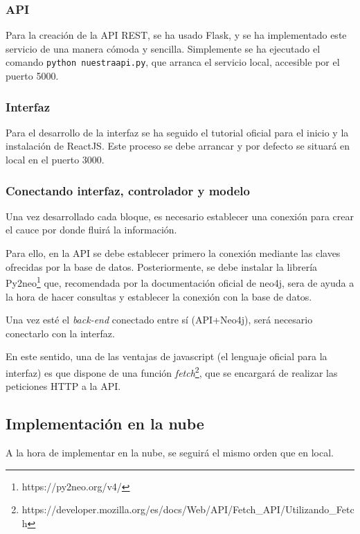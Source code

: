 \subsubsection{API}

Para la creación de la API REST, se ha usado Flask, y se ha implementado este servicio de una manera cómoda y sencilla. Simplemente se ha ejecutado el comando \texttt{python nuestraapi.py}, que arranca el servicio local, accesible por el puerto 5000\cite{flaskinstall}.

\subsubsection{Interfaz}

Para el desarrollo de la interfaz se ha seguido el tutorial oficial para el inicio y la instalación de ReactJS\cite{reactinstall}. Este proceso se debe arrancar y por defecto se situará en local en el puerto 3000.

\subsubsection{Conectando interfaz, controlador y modelo}

Una vez desarrollado cada bloque, es necesario establecer una conexión para crear el cauce por donde fluirá la información.

Para ello, en la API se debe establecer primero la conexión mediante las claves ofrecidas por la base de datos\cite{connectflaskneo4j}. Posteriormente, se debe instalar la librería Py2neo\footnote{https://py2neo.org/v4/} que, recomendada por la documentación oficial de neo4j, sera de ayuda a la hora de hacer consultas y establecer la conexión con la base de datos.

Una vez esté el \textit{back-end} conectado entre sí (API+Neo4j), será necesario conectarlo con la interfaz.

En este sentido, una de las ventajas de javascript (el lenguaje oficial para la interfaz) es que dispone de una función \textit{fetch}\footnote{https://developer.mozilla.org/es/docs/Web/API/Fetch\_API/Utilizando\_Fetch}, que se encargará de realizar las peticiones HTTP a la API. 

\subsection{Implementación en la nube}

A la hora de implementar en la nube, se seguirá el mismo orden que en local. 

